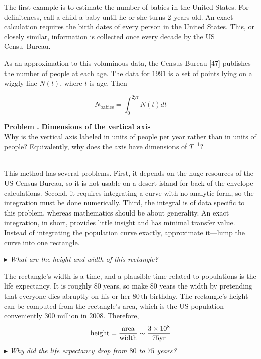 \documentclass[fleqn,12 pt]{book}
\newcounter{pro1}
\newcommand{\pro}{\par\addtocounter{pro1}{1}%
\textbf{Problem \arabic{chapter}.\arabic{pro1} }\quad}
\begin{document}
\noindent
The first example is to estimate the number of babies in the United States.
For definiteness, call a child a baby until he or she turns 2 years old.
An exact calculation requires the birth dates of every person in the United States.
This, or closely similar, information is collected once every decade by the US Censu~Bureau.
\par\bigskip
\hangindent=-4.5cm\noindent{}
As an approximation to this voluminous data, the Census Bureau [47] publishes the number of people at each age.
The data for $1991$ is a set of points lying on a wiggly line $N(t)$, where $t$ is age.
Then
\begin{flushleft}
\begin{equation}
N_\text{babies}=\int^{2 \text{yr}}_0 N(t)dt
\end{equation}
\end{flushleft}
\colorbox{light-gray}{
\begin{minipage}{\textwidth}
{\footnotesize
\pro
\textbf{Dimensions of the vertical axis}\\
Why is the vertical axis labeled in units of people per year rather than in units
of people?  Equivalently, why does the axis have dimensions of $T^{-1}$?}
\end{minipage}}\\

\noindent
This method has several problems.
First, it depends on the huge resources of the US Census Bureau, so it is not usable on a desert island for back-of-the-envelope calculations.
Second, it requires integrating a curve with no analytic form, so the integration must be done numerically.
Third, the integral is of data specific to this problem, whereas mathematics should be about generality.
An exact integration, in short, provides little insight and has minimal transfer value.
Instead of integrating the population curve exactly, approximate it---lump the curve into one rectangle.\\
\begin{flushleft}
$\blacktriangleright$ \textit{What are the height and width of this rectangle?}
\end{flushleft}

\noindent
The rectangle’s width is a time, and a plausible time related to populations is the life expectancy.
It is roughly $80$ years, so make $80$ years the width by pretending that everyone dies abruptly on his or her $80$\,th birthday.
The rectangle’s height can be computed from the rectangle’s area, which
is the US population---conveniently $300$ million in $2008$.
Therefore,
\begin{equation}
\text{height}=\frac{\text{area}}{\text{width}}\thicksim\frac{3 \times 10^8}{75 \text{yr}}
\end{equation}
$\blacktriangleright$ \textit{Why did the life expectancy drop from $80$ to $75$ years?}\newpage
\end{document}
